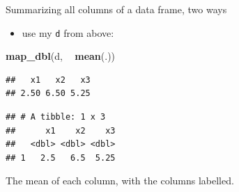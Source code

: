 \documentclass[ignorenonframetext,]{beamer}
\newenvironment{Shaded}{\begin{snugshade}}{\end{snugshade}}
\newcommand{\KeywordTok}[1]{\textcolor[rgb]{0.13,0.29,0.53}{\textbf{#1}}}
\newcommand{\NormalTok}[1]{#1}
\newcommand{\OperatorTok}[1]{\textcolor[rgb]{0.81,0.36,0.00}{\textbf{#1}}}
\newcommand{\StringTok}[1]{\textcolor[rgb]{0.31,0.60,0.02}{#1}}
\providecommand{\tightlist}{%
  \setlength{\itemsep}{0pt}\setlength{\parskip}{0pt}}
\begin{document}
\begin{frame}[fragile]{Summarizing all columns of a data frame, two
ways}
\protect\hypertarget{summarizing-all-columns-of-a-data-frame-two-ways}{}

\begin{itemize}
\tightlist
\item
  use my \texttt{d} from above:
\end{itemize}

\begin{Shaded}
\begin{Highlighting}[]
\KeywordTok{map_dbl}\NormalTok{(d, }\OperatorTok{~}\StringTok{ }\KeywordTok{mean}\NormalTok{(.))}
\end{Highlighting}
\end{Shaded}

\begin{verbatim}
##   x1   x2   x3 
## 2.50 6.50 5.25
\end{verbatim}

\begin{Shaded}
\end{Shaded}

\begin{verbatim}
## # A tibble: 1 x 3
##      x1    x2    x3
##   <dbl> <dbl> <dbl>
## 1   2.5   6.5  5.25
\end{verbatim}

The mean of each column, with the columns labelled.

\end{frame}
\end{document}

